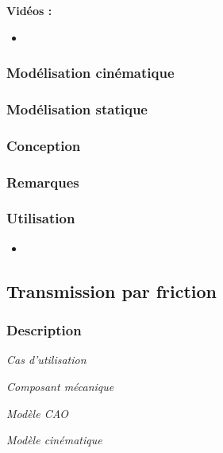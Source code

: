 \documentclass[11pt,oneside]{article}
\begin{document}
\textbf{Vidéos :}
\begin{itemize}
\item
\end{itemize}

\subsubsection{Modélisation cinématique}
\subsubsection{Modélisation statique}
\subsubsection{Conception}
\subsubsection{Remarques}
\subsubsection{Utilisation}
\begin{itemize}
\item
\end{itemize}
\newpage

\subsection{Transmission par friction}
\subsubsection{Description}

\begin{center}
\hfill
\begin{minipage}[c]{.21\linewidth}
\begin{center}
\textit{Cas d'utilisation}
\end{center}
\end{minipage} \hfill
\begin{minipage}[c]{.21\linewidth}
\begin{center}
\textit{Composant mécanique}
\end{center}
\end{minipage} \hfill
\begin{minipage}[c]{.21\linewidth}
\begin{center}
\textit{Modèle CAO}
\end{center} 
\end{minipage}\hfill
\begin{minipage}[c]{.21\linewidth}
\begin{center}
\textit{Modèle cinématique}
\end{center} 
\end{minipage}\hfill
\end{center}
\end{document}
